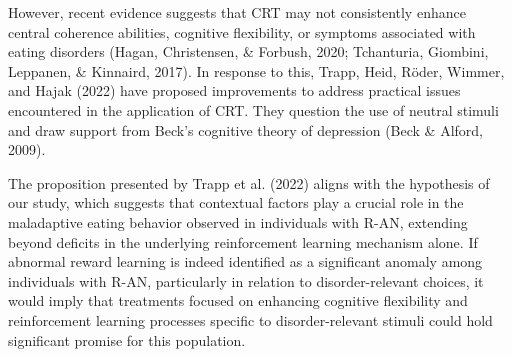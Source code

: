 \documentclass[
  man,floatsintext]{apa6}
\begin{document}
However, recent evidence suggests that CRT may not consistently enhance central coherence abilities, cognitive flexibility, or symptoms associated with eating disorders (Hagan, Christensen, \& Forbush, 2020; Tchanturia, Giombini, Leppanen, \& Kinnaird, 2017). In response to this, Trapp, Heid, Röder, Wimmer, and Hajak (2022) have proposed improvements to address practical issues encountered in the application of CRT. They question the use of neutral stimuli and draw support from Beck's cognitive theory of depression (Beck \& Alford, 2009).

The proposition presented by Trapp et al. (2022) aligns with the hypothesis of our study, which suggests that contextual factors play a crucial role in the maladaptive eating behavior observed in individuals with R-AN, extending beyond deficits in the underlying reinforcement learning mechanism alone. If abnormal reward learning is indeed identified as a significant anomaly among individuals with R-AN, particularly in relation to disorder-relevant choices, it would imply that treatments focused on enhancing cognitive flexibility and reinforcement learning processes specific to disorder-relevant stimuli could hold significant promise for this population.
\end{document}
